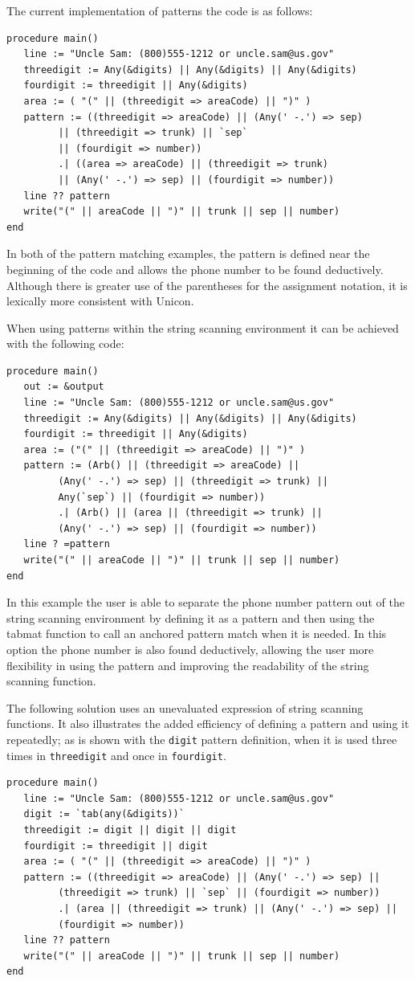 \documentclass{article}
\begin{document}
The current implementation of patterns the code is as follows:
\begin{verbatim}
procedure main()
   line := "Uncle Sam: (800)555-1212 or uncle.sam@us.gov"
   threedigit := Any(&digits) || Any(&digits) || Any(&digits)
   fourdigit := threedigit || Any(&digits)
   area := ( "(" || (threedigit => areaCode) || ")" )
   pattern := ((threedigit => areaCode) || (Any(' -.') => sep) 
         || (threedigit => trunk) || `sep` 
         || (fourdigit => number))
         .| ((area => areaCode) || (threedigit => trunk) 
         || (Any(' -.') => sep) || (fourdigit => number))
   line ?? pattern
   write("(" || areaCode || ")" || trunk || sep || number) 
end
\end{verbatim}
In both of the pattern matching examples, the pattern is defined near the beginning of the code and allows the phone number to be found deductively. Although there is greater use of the parentheses for the assignment notation, it is lexically more consistent with Unicon. 

When using patterns within the string scanning environment it can be achieved with the following code:
\begin{verbatim}
procedure main()
   out := &output
   line := "Uncle Sam: (800)555-1212 or uncle.sam@us.gov"
   threedigit := Any(&digits) || Any(&digits) || Any(&digits)
   fourdigit := threedigit || Any(&digits)
   area := ("(" || (threedigit => areaCode) || ")" )
   pattern := (Arb() || (threedigit => areaCode) || 
         (Any(' -.') => sep) || (threedigit => trunk) || 
         Any(`sep`) || (fourdigit => number)) 
         .| (Arb() || (area || (threedigit => trunk) || 
         (Any(' -.') => sep) || (fourdigit => number))
   line ? =pattern 
   write("(" || areaCode || ")" || trunk || sep || number)
end
\end{verbatim}
In this example the user is able to separate the phone number pattern out of the string scanning environment by defining it as a pattern and then using the tabmat function to call an anchored pattern match when it is needed.  In this option the phone number is also found deductively, allowing the user more flexibility in using the pattern and improving the readability of the string scanning function.

The following solution uses an unevaluated expression of string scanning functions.  It also illustrates the added efficiency of defining a pattern and using it repeatedly; as is shown with the \texttt{digit} pattern definition, when it is used three times in \texttt{threedigit} and once in \texttt{fourdigit}. 
\begin{verbatim}
procedure main()
   line := "Uncle Sam: (800)555-1212 or uncle.sam@us.gov"
   digit := `tab(any(&digits))`
   threedigit := digit || digit || digit
   fourdigit := threedigit || digit
   area := ( "(" || (threedigit => areaCode) || ")" )
   pattern := ((threedigit => areaCode) || (Any(' -.') => sep) ||
         (threedigit => trunk) || `sep` || (fourdigit => number)) 
         .| (area || (threedigit => trunk) || (Any(' -.') => sep) ||
         (fourdigit => number))
   line ?? pattern
   write("(" || areaCode || ")" || trunk || sep || number) 
end
\end{verbatim}
\end{document}
